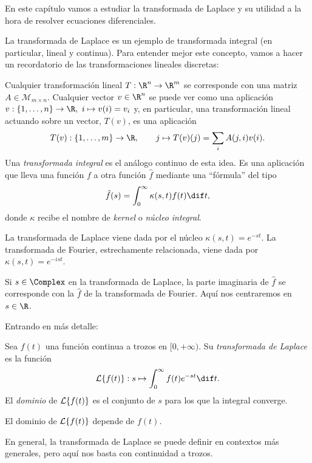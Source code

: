 \documentclass[../ecuaciones_diferenciales.tex]{subfiles}
\begin{document}
En este capítulo vamos a estudiar la transformada de Laplace y su utilidad a la
hora de resolver ecuaciones diferenciales.

La transformada de Laplace es un ejemplo de transformada integral (en
particular, lineal y continua). Para entender mejor este concepto, vamos a
hacer un recordatorio de las transformaciones lineales discretas:

Cualquier transformación lineal \(T : \R^n \to \R^m\) se corresponde con una
matriz \(A \in \mathcal{M}_{m \times n}\). Cualquier vector \(v \in \R^n\) se
puede ver como una aplicación
\(v : \{1, \dots, n\} \to \R,\ i \mapsto v(i) = v_i\) y, en particular, una
transformación lineal actuando sobre un vector, \(T(v)\), es una aplicación
\[T(v) : \{1, \dots, m\} \to \R, \qquad j \mapsto T(v)(j) = \sum_i A(j,i)v(i).\]
Una \emph{transformada integral} es el análogo continuo de esta idea. Es una
aplicación que lleva una función \(f\) a otra función \(\hat{f}\) mediante una
``fórmula'' del tipo
\[\hat{f}(s) = \int_0^\infty \kappa(s,t) f(t) \dif t,\]
donde \(\kappa\) recibe el nombre de \emph{kernel} o \emph{núcleo integral}.

La transformada de Laplace viene dada por el núcleo \(\kappa(s,t) =
e^{-st}\). La transformada de Fourier, estrechamente relacionada, viene dada por
\(\kappa(s,t) = e^{-ist}\).

\begin{remark}
	Si \(s \in \Complex\) en la transformada de Laplace, la parte imaginaria de
	\(\hat{f}\) se corresponde con la \(\hat{f}\) de la transformada de
	Fourier. Aquí nos centraremos en \(s \in \R\).
\end{remark}

Entrando en más detalle:

\begin{definition}
	Sea \(f(t)\) una función continua a trozos en \([0,+\infty)\). Su
	\emph{transformada de Laplace} es la función
	\[\L\{f(t)\} : s \mapsto \int_0^\infty f(t)e^{-st} \dif t.\]
	El \emph{dominio} de \(\mathcal{L}\{f(t)\}\) es el conjunto de \(s\) para los que la
	integral converge.
\end{definition}

\begin{remark}
	El dominio de \(\mathcal{L}\{f(t)\}\) depende de \(f(t)\).
\end{remark}

\begin{remark}
	En general, la transformada de Laplace se puede definir en contextos más
	generales, pero aquí nos basta con continuidad a trozos.
\end{remark}
\end{document}

